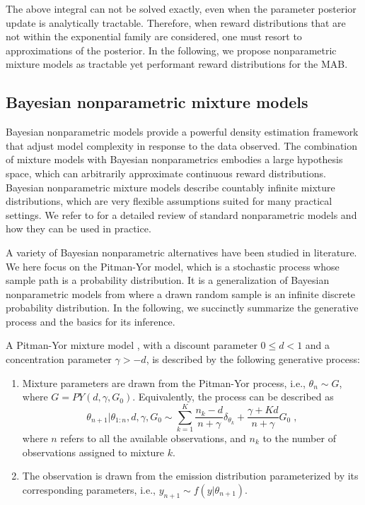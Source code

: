 \documentclass{article}
\newcommand{\ie}{i.e., }
\begin{document}
The above integral can not be solved exactly, even when the parameter posterior update is analytically tractable. Therefore, when reward distributions that are not within the exponential family are considered, one must resort to approximations of the posterior. In the following, we propose nonparametric mixture models as tractable yet performant reward distributions for the MAB.

\subsection{Bayesian nonparametric mixture models}
\label{ssec:background_nonparametric_mixture_model}

Bayesian nonparametric models provide a powerful density estimation framework that adjust model complexity in response to the data observed. The combination of mixture models with Bayesian nonparametrics embodies a large hypothesis space, which can arbitrarily approximate continuous reward distributions. Bayesian nonparametric mixture models describe countably infinite mixture distributions, which are very flexible assumptions suited for many practical settings. We refer to \cite{j-Gershman2012} for a detailed review of standard nonparametric models and how they can be used in practice.

A variety of Bayesian nonparametric alternatives have been studied in literature. We here focus on the Pitman-Yor model, which is a stochastic process whose sample path is a probability distribution. It is a generalization of Bayesian nonparametric models from where a drawn random sample is an infinite discrete probability distribution. In the following, we succinctly summarize the generative process and the basics for its inference.

A Pitman-Yor mixture model \cite{j-Teh2010}, with a discount parameter $0 \leq d < 1$ and a concentration parameter $\gamma > -d$, is described by the following generative process:
\begin{enumerate}
	\item Mixture parameters are drawn from the Pitman-Yor process, \ie $\theta_n \sim G$, where $G=PY(d, \gamma, G_0)$. Equivalently, the process can be described as 
	\begin{equation}
	\theta_{n+1}|\theta_{1:n}, d, \gamma, G_0 \sim \sum_{k=1}^{K} \frac{n_k-d}{n+\gamma}\delta_{\theta_k} + \frac{\gamma+Kd}{n+\gamma}G_0 \; ,
	\label{eq:pitman_yor_mixture}
	\end{equation}
	where $n$ refers to all the available observations, and $n_k$ to the number of observations assigned to mixture $k$.
	\item The observation is drawn from the emission distribution parameterized by its corresponding parameters, \ie $y_{n+1} \sim f(y|\theta_{n+1})$.
\end{enumerate}
\end{document}
